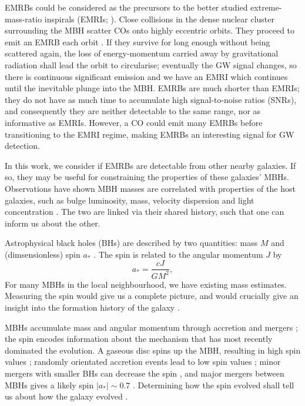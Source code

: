 \documentclass[useAMS,usedcolumn,usegraphicx,usenatbib]{mn2e}
\begin{document}
EMRBs could be considered as the precursors to the better studied extreme-mass-ratio inspirals (EMRIs; \citealt{Amaro-Seoane2007}). Close collisions in the dense nuclear cluster surrounding the MBH scatter COs onto highly eccentric orbits. They proceed to emit an EMRB each orbit \citep*{Rubbo2006}. If they survive for long enough without being scattered again, the loss of energy-momentum carried away by gravitational radiation shall lead the orbit to circularise; eventually the GW signal changes, so there is continuous significant emission and we have an EMRI which continues until the inevitable plunge into the MBH. EMRBs are much shorter than EMRIs; they do not have as much time to accumulate high signal-to-noise ratios (SNRs), and consequently they are neither detectable to the same range, nor as informative as EMRIs. However, a CO could emit many EMRBs before transitioning to the EMRI regime, making EMRBs an interesting signal for GW detection.

In this work, we consider if EMRBs are detectable from other nearby galaxies. If so, they may be useful for constraining the properties of these galaxies' MBHs. Observations have shown MBH masses are correlated with properties of the host galaxies, such as bulge luminosity, mass, velocity dispersion and light concentration \citep{Kormendy1995, Magorrian1998, Ferrarese2000, Gebhardt2000, Graham2001, Tremaine2002, Marconi2003, Haring2004, Graham2007, Graham2011}. The two are linked via their shared history, such that one can inform us about the other.

Astrophysical black holes (BHs) are described by two quantities: mass $M$ and (dimsensionless) spin $a_\ast$ \citep{Chandrasekhar1998}. The spin is related to the angular momentum $J$ by
\begin{equation}
a_\ast = \frac{cJ}{GM^2},
\end{equation}
For many MBHs in the local neighbourhood, we have existing mass estimates. Measuring the spin would give us a complete picture, and would crucially give an insight into the formation history of the galaxy \citep{Dotti2012,Volonteri2012a}.

MBHs accumulate mass and angular momentum through accretion and mergers \citep{Volonteri2010, Yu2002}; the spin encodes information about the mechanism that has most recently dominated the evolution. A gaseous disc spins up the MBH, resulting in high spin values \citep{Volonteri2005}; randomly orientated accretion events lead to low spin values \citep*{King2006, King2008}; minor mergers with smaller BHs can decrease the spin \citep*{Hughes2003, Gammie2004}, and major mergers between MBHs gives a likely spin $|a_\ast| \sim 0.7$ \citep{Berti2008, Gonzalez2007}. Determining how the spin evolved shall tell us about how the galaxy evolved \citep{Barausse2012}.
\end{document}
